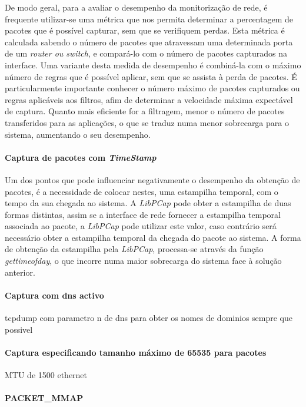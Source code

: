 De modo geral, para a avaliar o desempenho da monitorização de rede, é frequente utilizar-se uma métrica que nos permita determinar a percentagem de pacotes que é possível capturar, sem que se verifiquem perdas.
Esta métrica é calculada sabendo o número de pacotes que atravessam uma determinada porta de um \textit{router ou switch}, e compará-lo com o número de pacotes capturados na interface.
Uma variante desta medida de desempenho é combiná-la com o máximo número de regras que é possível aplicar, sem que se assista à perda de pacotes.
É particularmente importante conhecer o número máximo de pacotes capturados ou regras aplicáveis aos filtros, afim de determinar a velocidade máxima expectável de captura.
Quanto mais eficiente for a filtragem, menor o número de pacotes transferidos para as aplicações, o que se traduz numa menor sobrecarga para o sistema, aumentando o seu desempenho.

\paragraph{Captura de pacotes com \textit{TimeStamp}}
Um dos pontos que pode influenciar negativamente o desempenho da obtenção de pacotes, é a necessidade de colocar nestes, uma estampilha temporal, com o tempo da sua chegada ao sistema.
A \textit{LibPCap} pode obter a estampilha de duas formas distintas, assim se a interface de rede fornecer a estampilha temporal associada ao pacote, a \textit{LibPCap} pode utilizar este valor, caso contrário será necessário obter a estampilha temporal da chegada do pacote ao sistema.
A forma de obtenção da estampilha pela \textit{LibPCap}, processa-se através da função \textit{gettimeofday}, o que incorre numa maior sobrecarga do sistema face à solução anterior.

\paragraph{Captura com dns activo}

tcpdump com parametro n de dns para obter os nomes de dominios sempre que possivel

\paragraph{Captura especificando tamanho máximo de 65535 para pacotes}

MTU de 1500 ethernet

\paragraph*{PACKET\_MMAP}

